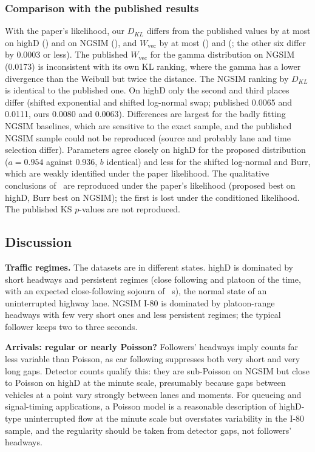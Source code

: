 \documentclass[10pt,a4paper]{article}
\numberwithin{equation}{section}
\newcommand{\Wvec}{W_{\mathrm{vec}}}
\begin{document}
\subsubsection{Comparison with the published results}\label{sec:published}
With the paper's likelihood, our $D_{KL}$ differs from the published values by at most \hdKLMaxDiffPaper{} on highD (\hdKLMaxDiffPaperName) and \ngKLMaxDiffPaper{} on NGSIM (\ngKLMaxDiffPaperName), and $\Wvec$ by at most \hdWvecMaxDiffPaper{} (\hdWvecMaxDiffPaperName) and \ngWvecMaxDiffPaper{} (\ngWvecMaxDiffPaperName; the other six differ by 0.0003 or less).
The published $\Wvec$ for the gamma distribution on NGSIM (0.0173) is inconsistent with its own KL ranking, where the gamma has a lower divergence than the Weibull but twice the distance. The NGSIM ranking by $D_{KL}$ is identical to the published one. On highD only the second and third places differ (shifted exponential and shifted log-normal swap; published 0.0065 and 0.0111, ours 0.0080 and 0.0063).
Differences are largest for the badly fitting NGSIM baselines, which are sensitive to the exact sample, and the published NGSIM sample could not be reproduced (source and probably lane and time selection differ). Parameters agree closely on highD for the proposed distribution ($a=0.954$ against 0.936, $b$ identical) and less for the shifted log-normal and Burr, which are weakly identified under the paper likelihood.
The qualitative conclusions of~\cite{leungbootnak} are reproduced under the paper's likelihood (proposed best on highD, Burr best on NGSIM); the first is lost under the conditioned likelihood. The published KS $p$-values are not reproduced.

\subsection{Discussion}\label{sec:overall}
\textbf{Traffic regimes.} The datasets are in different states. highD is dominated by short headways and persistent regimes (close following \hdPiC{} and platoon \hdPiP{} of the time, with an expected close-following sojourn of \hdSojC~s), the normal state of an uninterrupted highway lane. NGSIM I-80 is dominated by platoon-range headways with few very short ones and less persistent regimes; the typical follower keeps two to three seconds.

\textbf{Arrivals: regular or nearly Poisson?} Followers' headways imply counts far less variable than Poisson, as car following suppresses both very short and very long gaps. Detector counts qualify this: they are sub-Poisson on NGSIM but close to Poisson on highD at the minute scale, presumably because gaps between vehicles at a point vary strongly between lanes and moments.
For queueing and signal-timing applications, a Poisson model is a reasonable description of highD-type uninterrupted flow at the minute scale but overstates variability in the I-80 sample, and the regularity should be taken from detector gaps, not followers' headways.
\end{document}
